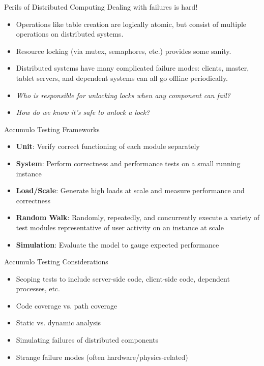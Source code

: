 \documentclass[t,landscape]{beamer}
\begin{document}
\begin{frame}{Perils of Distributed Computing}
\small
Dealing with failures is hard!
\scriptsize
\begin{itemize}
\item{Operations like table creation are logically atomic, but consist of multiple operations on distributed systems.}
\item{Resource locking (via mutex, semaphores, etc.) provides some sanity.}
\item{Distributed systems have many complicated failure modes: clients, master, tablet servers, and dependent systems can all go offline periodically.}
\item{\emph{Who is responsible for unlocking locks when any component can fail?}}
\item{\emph{How do we know it's safe to unlock a lock?}}
\end{itemize}
\end{frame}

\begin{frame}{Accumulo Testing Frameworks}
\begin{itemize}
\item{\textbf{Unit}: Verify correct functioning of each module separately}
\item{\textbf{System}: Perform correctness and performance tests on a small running instance}
\item{\textbf{Load/Scale}: Generate high loads at scale and measure performance and correctness}
\item{\textbf{Random Walk}: Randomly, repeatedly, and concurrently execute a variety of test modules representative of user activity on an instance at scale}
\item{\textbf{Simulation}: Evaluate the model to gauge expected performance}
\end{itemize}
\end{frame}

\begin{frame}{Accumulo Testing Considerations}
\begin{itemize}
\item{Scoping tests to include server-side code, client-side code, dependent processes, etc.}
\item{Code coverage vs. path coverage}
\item{Static vs. dynamic analysis}
\item{Simulating failures of distributed components}
\item{Strange failure modes (often hardware/physics-related)}
\end{itemize}
\end{frame}
\end{document}
